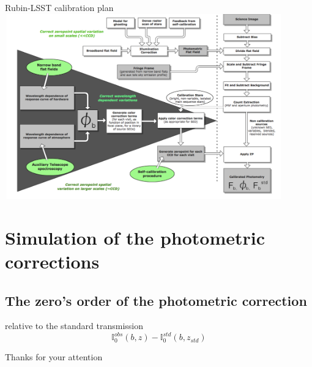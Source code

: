 \documentclass{beamer}
\begin{document}
\begin{frame}{Rubin-LSST calibration plan}
\includegraphics[width=12cm, height=8cm]{figs/calib/LSSTCalibrationPlan.png}
\end{frame}


\section{Simulation of the photometric corrections}
\subsection{The zero's order of the photometric correction}
\begin{frame}
\begin{alertblock}{relative to the standard transmission}
\begin{equation}
\mathbb{I}^{obs}_{0}(b,z) - \mathbb{I}^{std}_{0}(b,z_{std})
\end{equation}
\end{alertblock}
\end{frame}

\begin{frame}
\begin{center}
{

\LARGE \alert{Thanks for your attention}}

\end{center}

\end{frame}

 
\end{document}
